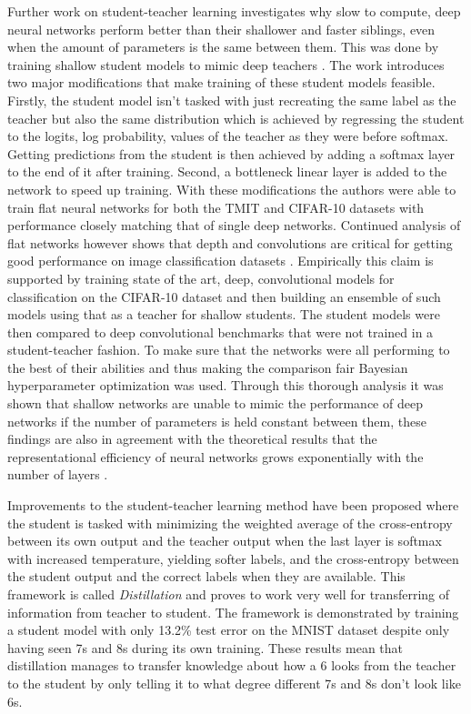 \documentclass{kththesis}
\newcommand{\bibentry}[1]{\parencite{#1}}
\begin{document}
Further work on student-teacher learning investigates why slow to compute, deep
neural networks perform better than their shallower and faster siblings, even when
the amount of parameters is the same between them.
This was done by training shallow student models to mimic
deep teachers \bibentry{ba2014deep}. The work introduces two major modifications
that make training of these student models feasible. Firstly, the student model
isn't tasked with just recreating the same label as the teacher but also the
same distribution which is achieved by regressing the student to the logits, log
probability, values of the teacher as they were before softmax. Getting
predictions from the student is then achieved by adding a softmax layer to the
end of it after training. Second, a bottleneck linear layer is added to the
network to speed up training. With these modifications the authors were able to train
flat neural networks for both the TMIT and CIFAR-10 datasets with performance
closely matching that of single deep networks. Continued analysis of flat
networks however shows that depth and convolutions are critical for getting good
performance on image classification datasets \bibentry{urban2016deep}.
Empirically this claim is supported by training state of the art, deep,
convolutional models for classification on the CIFAR-10 dataset and then
building an ensemble of such models using that as a teacher for shallow
students. The student models were then compared to deep convolutional benchmarks
that were not trained in a student-teacher fashion. To make sure that the
networks were all performing to the best of their abilities and thus making the
comparison fair Bayesian hyperparameter optimization
\bibentry{snoek2012practical} was used. Through this thorough analysis it was
shown that shallow networks are unable to mimic the performance of deep networks
if the number of parameters is held constant between them, these findings are
also in agreement with the theoretical results that the representational
efficiency of neural networks grows exponentially with the number of layers
\bibentry{liang2016deep}. 

Improvements to the student-teacher learning method have been proposed where the
student is tasked with minimizing the weighted average of the cross-entropy
between its own output and the teacher output when the last layer is softmax
with increased temperature, yielding softer labels, and the cross-entropy
between the student output and the correct labels when they are available. This
framework is called \emph{Distillation} \bibentry{hinton2015distilling} and
proves to work very well for transferring of information from teacher to
student. The framework is demonstrated by training a student model with only
13.2\% test error on the MNIST dataset despite only having seen 7s and 8s during
its own training. These results mean that distillation manages to transfer
knowledge about how a 6 looks from the teacher to the student by only telling it
to what degree different 7s and 8s don't look like 6s. 
\end{document}
